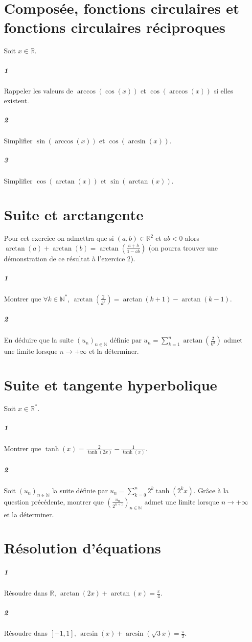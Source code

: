\documentclass[10pt,a4paper]{article}
\begin{document}
\section{Composée, fonctions circulaires et fonctions circulaires réciproques}
Soit $x \in \mathbb{R}$.
\subparagraph{1}Rappeler les valeurs de $\arccos(\cos(x))$ et $\cos(\arccos(x))$ si elles existent.
\subparagraph{2}Simplifier $\sin(\arccos(x))$ et $\cos(\arcsin(x))$.
\subparagraph{3}Simplifier $\cos(\arctan(x))$ et $\sin(\arctan(x))$.

\section{Suite et arctangente}
Pour cet exercice on admettra que si $(a,b) \in \mathbb{R}^2$ et $ab<0$ alors $\arctan(a)+\arctan(b)=\arctan(\frac{a+b}{1-ab})$ (on pourra trouver une démonstration de ce résultat à l'exercice 2).
\subparagraph{1}Montrer que $\forall k \in \mathbb{N}^{*}$, $\arctan(\frac{2}{k^2})=\arctan(k+1)-\arctan(k-1)$.
\subparagraph{2}En déduire que la suite $(u_n)_{n \in \mathbb{N}}$ définie par $u_n=\sum_{k=1}^n \arctan(\frac{2}{k^2})$ admet une limite lorsque $n \rightarrow +\infty$ et la déterminer.

\section{Suite et tangente hyperbolique}
Soit $x \in \mathbb{R}^{*}$.
\subparagraph{1}Montrer que $\tanh(x)=\frac{2}{\tanh(2x)}-\frac{1}{\tanh(x)}$.
\subparagraph{2}Soit $(u_n)_{n \in \mathbb{N}}$ la suite définie par $u_n=\sum_{k=0}^n 2^k \tanh(2^kx)$. Grâce à la question précédente, montrer que $(\frac{u_n}{2^{n+1}})_{n \in \mathbb{N}}$ admet une limite lorsque $n \rightarrow +\infty$ et la déterminer.

\section{Résolution d'équations}
\subparagraph{1}Résoudre dans $\mathbb{R}$, $\arctan(2x)+\arctan(x)=\frac{\pi}{4}$.
\subparagraph{2}Résoudre dans $[-1,1]$, $\arcsin(x)+\arcsin(\sqrt{3}x)=\frac{\pi}{2}$.
\end{document}
